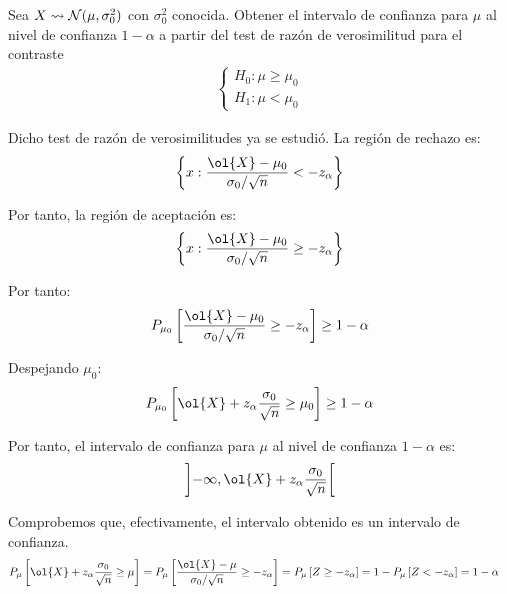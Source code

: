 \begin{ejercicio}
    Sea $X \rightsquigarrow \mathcal{N}(\mu, \sigma^2_0)$ con $\sigma^2_0$ conocida. Obtener el intervalo de confianza para $\mu$ al nivel de confianza $1-\alpha$ a partir del test de razón de verosimilitud para el contraste
\begin{align*}
    \begin{cases}
        H_0: \mu \geq \mu_0 \\
        H_1: \mu < \mu_0
    \end{cases}
\end{align*}


    Dicho test de razón de verosimilitudes ya se estudió. La región de rechazo es:
    \begin{equation*}
        \left\{x: \dfrac{\ol{X} - \mu_0}{\sigma_0/\sqrt{n}} < -z_{\alpha}\right\}
    \end{equation*}

    Por tanto, la región de aceptación es:
    \begin{equation*}
        \left\{x: \dfrac{\ol{X} - \mu_0}{\sigma_0/\sqrt{n}} \geq -z_{\alpha}\right\}
    \end{equation*}

    Por tanto:
    \begin{align*}
        P_{\mu_0}\left[\dfrac{\ol{X} - \mu_0}{\sigma_0/\sqrt{n}} \geq -z_{\alpha}\right] \geq 1 - \alpha
    \end{align*}

    Despejando $\mu_0$:
    \begin{align*}
        P_{\mu_0}\left[\ol{X} + z_{\alpha}\dfrac{\sigma_0}{\sqrt{n}} \geq \mu_0\right] \geq 1 - \alpha
    \end{align*}

    Por tanto, el intervalo de confianza para $\mu$ al nivel de confianza $1-\alpha$ es:
    \begin{align*}
        \left]-\infty, \ol{X} + z_{\alpha}\dfrac{\sigma_0}{\sqrt{n}}\right[
    \end{align*}

    Comprobemos que, efectivamente, el intervalo obtenido es un intervalo de confianza.
    \begin{align*}
        P_\mu\left[\ol{X} + z_{\alpha}\dfrac{\sigma_0}{\sqrt{n}} \geq \mu\right] &= P_\mu\left[\dfrac{\ol{X} - \mu}{\sigma_0/\sqrt{n}} \geq -z_{\alpha}\right] = P_\mu\left[Z \geq -z_{\alpha}\right] = 1 - P_\mu\left[Z < -z_{\alpha}\right] = 1 - \alpha
    \end{align*}


\end{ejercicio}